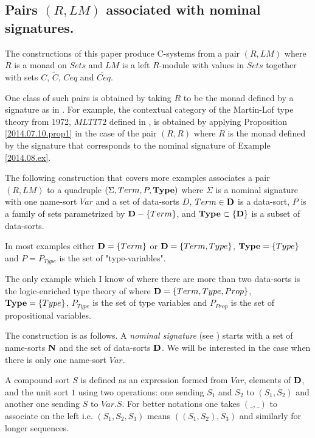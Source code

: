 \documentclass[11pt]{article}
\newcommand{\llabel}[1]{\label{#1}}
\newcommand{\wt}{\widetilde}
\begin{document}
\subsection{Pairs $(R,LM)$ associated with nominal signatures.}
%
\llabel{2014.07.22.sec}
%
The constructions of this paper produce C-systems from a pair $(R,LM)$ where $R$ is a monad on $Sets$ and $LM$ is a left $R$-module with values in $Sets$ together with sets $C$, $\wt{C}$, $Ceq$ and $\wt{Ceq}$. 

One class of such pairs is obtained by taking $R$ to be the monad defined by a signature as in \cite[p.228]{HM2007}. For example, the contextual category of the Martin-Lof type theory from 1972,  $MLTT72$ defined in \cite{ML72}, is obtained by applying Proposition \ref{2014.07.10.prop1} in the case of the pair $(R,R)$ where $R$ is the monad defined by the signature that corresponds to the nominal signature of Example \ref{2014.08.ex}.


  

The following construction that covers more examples associates a pair $(R,LM)$ to a quadruple $(\Sigma, Term, P, {\bf Type})$ where $\Sigma$ is a nominal signature with one name-sort $Var$ and a set of data-sorts $D$, $Term\in {\bf D}$ is a data-sort, $P$ is a family of sets parametrized by ${\bf D}-\{Term\}$,  and ${\bf Type}\subset \{\bf D\}$ is a subset of data-sorts. 

In most examples either ${\bf D}=\{Term\}$ or ${\bf D}=\{Term,Type\}$, ${\bf Type}=\{Type\}$ and $P=P_{Type}$ is the set of "type-variables". 

The only example which I know of where there are more than two data-sorts is the logic-enriched type theory of \cite{AczelGambino} where ${\bf D}=\{Term, Type, Prop\}$, ${\bf Type}=\{Type\}$, $P_{Type}$ is the set of type variables and $P_{Prop}$ is the set of propositional variables. 

The construction is as follows.  A {\em nominal signature} (see \cite[Section 8.1]{Pitts}) starts with a set of name-sorts $\bf N$ and the set of data-sorts $\bf D$. We will be interested in the case when there is only one name-sort $Var$.

A compound sort $S$ is defined as an expression formed from $Var$, elements of $\bf D$, and the unit sort $1$ using two operations: one sending $S_1$ and $S_2$ to $(S_1,S_2)$ and another one sending $S$ to $Var.S$.  For better notations one takes $(\_,\_)$ to associate on the left i.e. $(S_1,S_2,S_3)$ means $((S_1,S_2),S_3)$ and similarly for longer sequences. 
\end{document}

